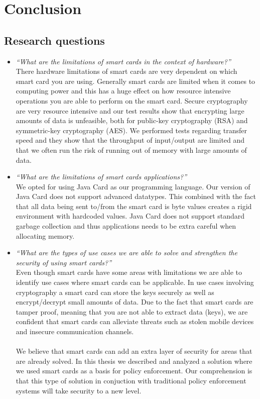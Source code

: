 \chapter{Conclusion}
\label{ch:conclusion}

\section{Research questions}
\begin{itemize}
  \item \textit{``What are the limitations of smart cards in the context of hardware?''}\\
  There hardware limitations of smart cards are very dependent on which smart card you are using. Generally smart cards are limited when it comes to computing power and this has a huge effect on how resource intensive operations you are able to perform on the smart card. Secure cryptography are very resource intensive and our test results show that encrypting large amounts of data is unfeasible, both for public-key cryptography (RSA) and symmetric-key cryptography (AES). We performed tests regarding transfer speed and they show that the throughput of input/output are limited and that we often run the risk of running out of memory with large amounts of data.
  \item \textit{``What are the limitations of smart cards applications?''}\\
  We opted for using Java Card as our programming language. Our version of Java Card does not support advanced datatypes. This combined with the fact that all data being sent to/from the smart card is byte values creates a rigid environment with hardcoded values. Java Card does not support standard garbage collection and thus applications needs to be extra careful when allocating memory.
  \item \textit{``What are the types of use cases we are able to solve and strengthen the security of using smart cards?''}\\
  Even though smart cards have some areas with limitations we are able to identify use cases where smart cards can be applicable. In use cases involving cryptography a smart card can store the keys securely as well as encrypt/decrypt small amounts of data. Due to the fact that smart cards are tamper proof, meaning that you are not able to extract data (keys), we are confident that smart cards can alleviate threats such as stolen mobile devices and insecure communication channels.\mbox{}\\\\  We believe that smart cards can add an extra layer of security for areas that are already solved. In this thesis we described and analyzed a solution where we used smart cards as a basis for policy enforcement. Our comprehension is that this type of solution in conjuction with traditional policy enforcement systems will take security to a new level.
\end{itemize}

